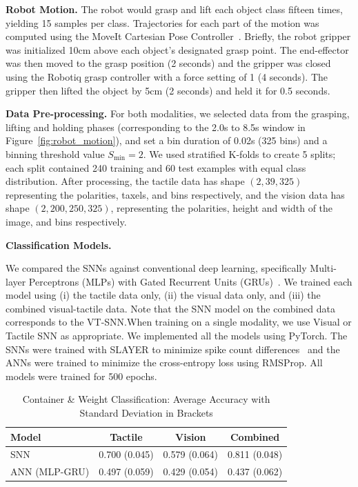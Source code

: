 \documentclass[fyp]{socreport}
\begin{document}
\noindent\textbf{Robot Motion.} The robot would grasp and lift each object class
fifteen times, yielding 15 samples per class. Trajectories for each part of the
motion was computed using the MoveIt Cartesian Pose
Controller~\cite{coleman2014reducing}. Briefly, the robot gripper was
initialized 10cm above each object's designated grasp point. The end-effector
was then moved to the grasp position (2 seconds) and the gripper was closed
using the Robotiq grasp controller with a force setting of 1 (4 seconds). The
gripper then lifted the object by 5cm (2 seconds) and held it for 0.5 seconds.

\noindent\textbf{Data Pre-processing.}
For both modalities, we selected data from the grasping, lifting and holding
phases (corresponding to the 2.0s to 8.5s window in
Figure~\ref{fig:robot_motion}), and set a bin duration of 0.02s (325 bins) and a
binning threshold value $S_{\text{min}} = 2$. We used stratified K-folds to
create 5 splits; each split contained 240 training and 60 test examples with
equal class distribution. After processing, the tactile data has shape
$(2, 39, 325)$ representing the polarities, taxels, and bins respectively, and
the vision data has shape $(2, 200, 250, 325)$, representing the polarities,
height and width of the image, and bins respectively.

\noindent\textbf{Classification Models.}

We compared the SNNs against conventional deep learning, specifically
Multi-layer Perceptrons (MLPs) with Gated Recurrent Units
(GRUs)~\cite{cho2014learning}. We trained each model using (i) the tactile data
only, (ii) the visual data only, and (iii) the combined visual-tactile data.
Note that the SNN model on the combined data corresponds to the VT-SNN.\@ When
training on a single modality, we use Visual or Tactile SNN as appropriate. We
implemented all the models using PyTorch. The SNNs were trained with SLAYER to
minimize spike count differences~\cite{NIPS2018_7415} and the ANNs were trained
to minimize the cross-entropy loss using RMSProp. All models were trained for
500 epochs.

\begin{table}
  \centering
  \caption{Container \& Weight Classification: Average Accuracy with Standard
    Deviation in Brackets\label{tbl:classacc325}}
  \begin{tabular}{lccc}
    \toprule
    \textbf{Model} & \textbf{Tactile} & \textbf{Vision} & \textbf{Combined} \\
    \midrule
    SNN  & {0.700} (0.045) & 0.579 (0.064)  & 0.811 (0.048)\\
    ANN (MLP-GRU) & 0.497 (0.059) & 0.429 (0.054) & 0.437 (0.062)\\
    \bottomrule
  \end{tabular}
\end{table}
\end{document}
